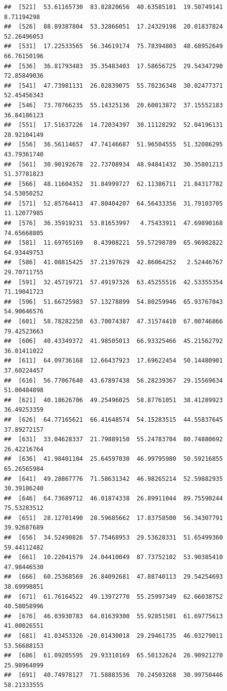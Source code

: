 \documentclass[
]{article}
\begin{document}
\begin{verbatim}
##  [521]  53.61165730  83.82820656  40.63585101  19.50749141   8.71194298
##  [526]  88.89387804  53.32866051  17.24329198  20.01837824  52.26496053
##  [531]  17.22533565  56.34619174  75.78394803  48.68952649  66.76150196
##  [536]  36.81793483  35.35483403  17.58656725  29.54347290  72.85849036
##  [541]  47.73981131  26.02839075  55.70236348  30.02477371  52.45456343
##  [546]  73.70766235  55.14325136  20.60013872  37.15552183  36.84186123
##  [551]  17.51637226  14.72034397  30.11128292  52.04196131  28.92104149
##  [556]  36.56114657  47.74146687  51.96504555  51.32086295  43.79361740
##  [561]  30.90192678  22.73708934  48.94841432  30.35801213  51.37781823
##  [566]  48.11604352  31.84999727  62.11386711  21.84317782  54.53050252
##  [571]  52.85764413  47.80404207  64.56433356  31.79103705  11.12077985
##  [576]  36.35919231  53.81653997   4.75433911  47.69890168  74.65668805
##  [581]  11.69765169   8.43908221  59.57298789  65.96982822  64.93449753
##  [586]  41.08815425  37.21397629  42.86064252   2.52446767  29.70711755
##  [591]  32.45719721  57.49197326  63.45255516  42.53355354  71.19041723
##  [596]  51.66725983  57.13278899  54.80259946  65.93767043  54.90646576
##  [601]  58.78282250  63.70074387  47.31574410  67.00746866  79.42523663
##  [606]  40.43349372  41.98505013  66.93325466  45.21562792  36.01411022
##  [611]  64.09736168  12.66437923  17.69622454  50.14480901  37.60224457
##  [616]  56.77067640  43.67897438  56.28239367  29.15569634  51.00484898
##  [621]  40.18626706  49.25496025  58.87761051  38.41289923  36.49253359
##  [626]  64.77165621  66.41648574  54.15283515  44.55837645  37.89272157
##  [631]  33.04628337  21.79889150  55.24783704  80.74880692  26.42216764
##  [636]  41.98401104  25.64597030  46.99795980  50.59216855  65.26565984
##  [641]  49.28867776  71.58631342  46.98265214  52.59882935  30.39186240
##  [646]  64.73689712  46.01874338  26.89911044  89.75590244  75.53283512
##  [651]  28.12701490  28.59685662  17.83758500  56.34307791  39.92687689
##  [656]  34.52490826  57.75468953  29.53628331  51.65499360  59.44112482
##  [661]  10.22041579  24.04410049  87.73752102  53.90385410  47.98446530
##  [666]  60.25368569  26.84092681  47.88740113  29.54254693  38.69998851
##  [671]  61.76164522  49.13972770  55.25997349  62.66038752  40.58058996
##  [676]  46.03930783  64.01639300  55.92851501  61.69775613  41.00026551
##  [681]  41.03453326 -20.01430018  29.29461735  46.03279011  53.56688153
##  [686]  61.09205595  29.93310169  65.50132624  26.90921270  25.98964099
##  [691]  40.74978127  71.58883536  70.24503268  30.99750446  58.21333555

\end{verbatim}
\end{document}
